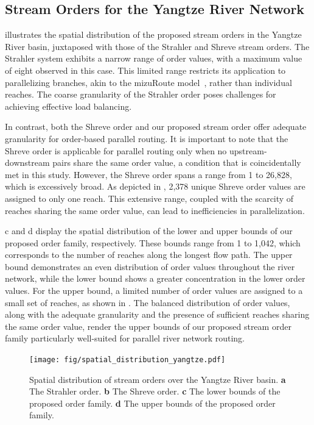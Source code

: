 \documentclass[water,article,submit,pdftex,moreauthors]{Definitions/mdpi}
\begin{document}
\subsection{Stream Orders for the Yangtze River Network}
\label{sec:stream_order_yangtze}

 illustrates the spatial distribution of the proposed stream orders in the Yangtze River basin, juxtaposed with those of the Strahler and Shreve stream orders. The Strahler system exhibits a narrow range of order values, with a maximum value of eight observed in this case. This limited range restricts its application to parallelizing branches, akin to the mizuRoute model~\cite{mizukami2021JAMES}, rather than individual reaches. The coarse granularity of the Strahler order poses challenges for achieving effective load balancing.

In contrast, both the Shreve order and our proposed stream order offer adequate granularity for order-based parallel routing. It is important to note that the Shreve order is applicable for parallel routing only when no upstream-downstream pairs share the same order value, a condition that is coincidentally met in this study. However, the Shreve order spans a range from 1 to 26,828, which is excessively broad. As depicted in , 2,378 unique Shreve order values are assigned to only one reach. This extensive range, coupled with the scarcity of reaches sharing the same order value, can lead to inefficiencies in parallelization.

c and d display the spatial distribution of the lower and upper bounds of our proposed order family, respectively. These bounds range from 1 to 1,042, which corresponds to the number of reaches along the longest flow path. The upper bound demonstrates an even distribution of order values throughout the river network, while the lower bound shows a greater concentration in the lower order values. For the upper bound, a limited number of order values are assigned to a small set of reaches, as shown in . The balanced distribution of order values, along with the adequate granularity and the presence of sufficient reaches sharing the same order value, render the upper bounds of our proposed stream order family particularly well-suited for parallel river network routing.

\begin{figure}[H]
	\texttt{[image: fig/spatial\_distribution\_yangtze.pdf]}
	\caption{Spatial distribution of stream orders over the Yangtze River basin. \textbf{a} The Strahler order. \textbf{b} The Shreve order. \textbf{c} The lower bounds of the proposed order family. \textbf{d} The upper bounds of the proposed order family. \label{fig:spatial_distribution_yangtze}}
\end{figure}
\end{document}
